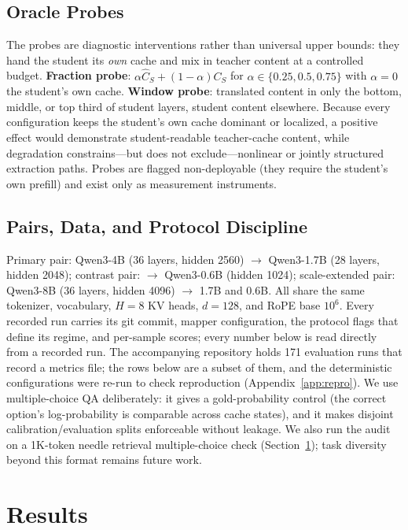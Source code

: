 \documentclass[10pt]{article}
\begin{document}
\subsection{Oracle Probes}
The probes are diagnostic interventions rather than universal upper bounds:
they hand the student its \emph{own} cache and mix in teacher content at a
controlled budget.
\textbf{Fraction probe}: $\alpha\widehat{C}_S + (1-\alpha)C_S$ for
$\alpha \in \{0.25, 0.5, 0.75\}$ with $\alpha{=}0$ the student's own cache.
\textbf{Window probe}: translated content in only the bottom, middle, or top
third of student layers, student content elsewhere. Because every
configuration keeps the student's own cache dominant or localized, a positive
effect would demonstrate student-readable teacher-cache content, while
degradation constrains---but does not exclude---nonlinear or jointly
structured extraction paths. Probes are
flagged non-deployable (they require the student's own prefill) and exist
only as measurement instruments.

\subsection{Pairs, Data, and Protocol Discipline}
Primary pair: Qwen3-4B (36 layers, hidden 2560) $\to$ Qwen3-1.7B (28 layers,
hidden 2048); contrast pair: $\to$ Qwen3-0.6B (hidden 1024); scale-extended
pair: Qwen3-8B (36 layers, hidden 4096) $\to$ 1.7B and 0.6B. All share the
same tokenizer, vocabulary, $H{=}8$ KV heads, $d{=}128$, and RoPE base
$10^6$. Every recorded run carries its git commit, mapper configuration, the
protocol flags that define its regime, and per-sample scores; every number
below is read directly from a recorded run. The accompanying repository holds
171 evaluation runs that record a metrics file; the rows below are a subset of
them, and the deterministic configurations were re-run to check reproduction
(Appendix~\ref{app:repro}).
We use multiple-choice QA deliberately: it gives a gold-probability control
(the correct option's log-probability is comparable across cache states),
and it makes disjoint calibration/evaluation splits enforceable without
leakage. We also run the audit on a 1K-token needle retrieval
multiple-choice check (Section~\ref{sec:results}); task diversity beyond this
format remains future work.

\section{Results}
\label{sec:results}
\end{document}
